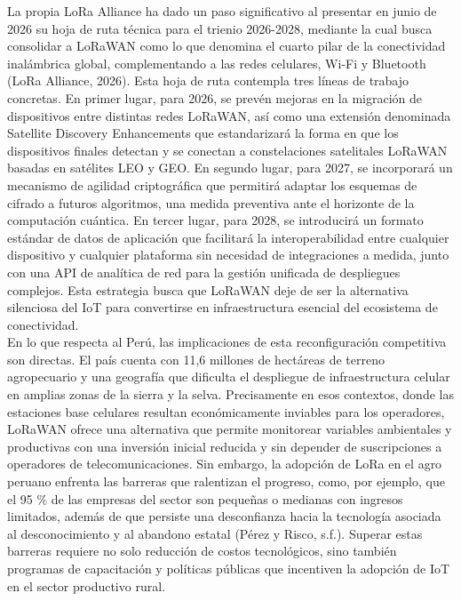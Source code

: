 \documentclass[12pt,a4paper]{article}
\begin{document}
	La propia LoRa Alliance ha dado un paso significativo al presentar en junio de 2026 su hoja de ruta técnica para el trienio 2026-2028, mediante la cual busca consolidar a LoRaWAN como lo que denomina el cuarto pilar de la conectividad inalámbrica global, complementando a las redes celulares, Wi-Fi y Bluetooth (LoRa Alliance, 2026). Esta hoja de ruta contempla tres líneas de trabajo concretas. En primer lugar, para 2026, se prevén mejoras en la migración de dispositivos entre distintas redes LoRaWAN, así como una extensión denominada Satellite Discovery Enhancements que estandarizará la forma en que los dispositivos finales detectan y se conectan a constelaciones satelitales LoRaWAN basadas en satélites LEO y GEO. En segundo lugar, para 2027, se incorporará un mecanismo de agilidad criptográfica que permitirá adaptar los esquemas de cifrado a futuros algoritmos, una medida preventiva ante el horizonte de la computación cuántica. En tercer lugar, para 2028, se introducirá un formato estándar de datos de aplicación que facilitará la interoperabilidad entre cualquier dispositivo y cualquier plataforma sin necesidad de integraciones a medida, junto con una API de analítica de red para la gestión unificada de despliegues complejos. Esta estrategia busca que LoRaWAN deje de ser la alternativa silenciosa del IoT para convertirse en infraestructura esencial del ecosistema de conectividad.\\

	En lo que respecta al Perú, las implicaciones de esta reconfiguración competitiva son directas. El país cuenta con 11,6 millones de hectáreas de terreno agropecuario y una geografía que dificulta el despliegue de infraestructura celular en amplias zonas de la sierra y la selva. Precisamente en esos contextos, donde las estaciones base celulares resultan económicamente inviables para los operadores, LoRaWAN ofrece una alternativa que permite monitorear variables ambientales y productivas con una inversión inicial reducida y sin depender de suscripciones a operadores de telecomunicaciones. Sin embargo, la adopción de LoRa en el agro peruano enfrenta las barreras que ralentizan el progreso, como, por ejemplo, que el 95 \% de las empresas del sector son pequeñas o medianas con ingresos limitados, además de que persiste una desconfianza hacia la tecnología asociada al desconocimiento y al abandono estatal (Pérez y Risco, s.f.). Superar estas barreras requiere no solo reducción de costos tecnológicos, sino también programas de capacitación y políticas públicas que incentiven la adopción de IoT en el sector productivo rural.\\
\end{document}
